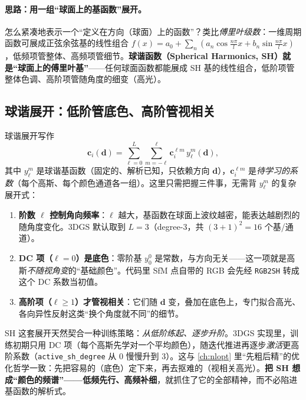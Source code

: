 \paragraph{思路：用一组“球面上的基函数”展开。}
怎么紧凑地表示一个“定义在方向（球面）上的函数”？类比\emph{傅里叶级数}：一维周期函数可展成正弦余弦基的线性组合 $f(x)=a_0+\sum_n(a_n\cos\tfrac{n\pi}{l}x+b_n\sin\tfrac{n\pi}{l}x)$，低频项管整体、高频项管细节。\textbf{球谐函数（Spherical Harmonics, SH）就是“球面上的傅里叶基”}——任何球面函数都能展成 SH 基的线性组合，低阶项管整体色调、高阶项管随角度的细变（高光）。

\subsection{球谐展开：低阶管底色、高阶管视相关}

球谐展开写作
\begin{equation}
  \mathbf c_i(\mathbf d)=\sum_{\ell=0}^{L}\sum_{m=-\ell}^{\ell}\mathbf c_i^{\ell m}\,y_\ell^m(\mathbf d),
  \label{eq:3dgs-sh}
\end{equation}
其中 $y_\ell^m$ 是球谐基函数（固定的、解析已知，只依赖方向 $\mathbf d$），$\mathbf c_i^{\ell m}$ 是\emph{待学习的系数}（每个高斯、每个颜色通道各一组）。这里只需把握三件事，无需背 $y_\ell^m$ 的复杂展开式：

\begin{enumerate}
  \item \textbf{阶数 $\ell$ 控制角向频率}：$\ell$ 越大，基函数在球面上波纹越密，能表达越剧烈的随角度变化。3DGS 默认取到 $L=3$（degree-3，共 $(3+1)^2=16$ 个基/通道）。
  \item \textbf{DC 项（$\ell=0$）是底色}：零阶基 $y_0^0$ 是常数，与方向无关——这一项就是高斯\emph{不随视角变}的“基础颜色”。代码里 SfM 点自带的 RGB 会先经 \texttt{RGB2SH} 转成这个 DC 系数当初值。
  \item \textbf{高阶项（$\ell\ge1$）才管视相关}：它们随 $\mathbf d$ 变，叠加在底色上，专门拟合高光、各向异性反射这类“换个角度就不同”的细节。
\end{enumerate}

\begin{insight}
SH 这套展开天然契合一种训练策略：\emph{从低阶练起、逐步升阶}。3DGS 实现里，训练初期只用 DC 项（每个高斯先学对一个平均颜色），随迭代推进再逐步\emph{激活}更高阶系数（\texttt{active\_sh\_degree} 从 $0$ 慢慢升到 $3$）。这与 \cref{ch:nlopt} 里“先粗后精”的优化哲学一致：先把容易的（底色）定下来，再去抠难的（视相关高光）。\textbf{把 SH 想成“颜色的频谱”——低频先行、高频补细}，就抓住了它的全部精神，而不必陷进基函数的解析式。
\end{insight}

